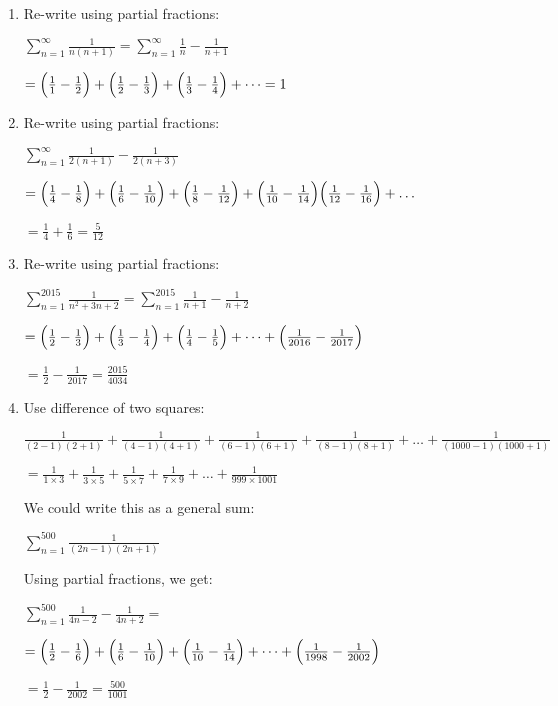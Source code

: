 \documentclass[../main.tex]{subfiles}
\begin{document}
\begin{enumerate}[itemsep=0.7cm]
    \item
    Re-write using partial fractions:

    $\sum\limits_{n=1}^\infty \frac{1}{n(n+1)}=\sum\limits_{n=1}^\infty \frac{1}{n}-\frac{1}{n+1}$

    $=\Bigl(\frac{1}{1}-\frac{1}{2}\Bigr)+\Bigl(\frac{1}{2}-\frac{1}{3}\Bigr)+\Bigl(\frac{1}{3}-\frac{1}{4}\Bigr)+\dots = 1$

    \item 
    Re-write using partial fractions:

    $\sum\limits_{n=1}^\infty \frac{1}{2(n+1)}-\frac{1}{2(n+3)}$

    $=\Bigl(\frac{1}{4}-\frac{1}{8}\Bigr)+\Bigl(\frac{1}{6}-\frac{1}{10}\Bigr)+\Bigl(\frac{1}{8}-\frac{1}{12}\Bigr)+\Bigl(\frac{1}{10}-\frac{1}{14}\Bigr)\Bigl(\frac{1}{12}-\frac{1}{16}\Bigr)+\dots$

    $=\frac{1}{4}+\frac{1}{6}=\frac{5}{12}$

    \item 
    Re-write using partial fractions:

    $\sum\limits_{n=1}^{2015} \frac{1}{n^2 +3n+2}=\sum\limits_{n=1}^{2015} \frac{1}{n+1}-\frac{1}{n+2}$

    $=\Bigl(\frac{1}{2}-\frac{1}{3}\Bigr)+\Bigl(\frac{1}{3}-\frac{1}{4}\Bigr)+\Bigl(\frac{1}{4}-\frac{1}{5}\Bigr)+\dots +\Bigl(\frac{1}{2016}-\frac{1}{2017}\Bigr)$

    $=\frac{1}{2}-\frac{1}{2017}=\frac{2015}{4034}$

    \item 
    Use difference of two squares:

    $\frac{1}{(2-1)(2+1)}+\frac{1}{(4-1)(4+1)}+\frac{1}{(6-1)(6+1)}+\frac{1}{(8-1)(8+1)}+\dots +\frac{1}{(1000-1)(1000+1)}$

    $=\frac{1}{1\times 3}+\frac{1}{3\times 5}+\frac{1}{5\times 7}+\frac{1}{7\times 9}+\dots +\frac{1}{999\times 1001}$

    We could write this as a general sum:

    $\sum\limits_{n=1}^{500} \frac{1}{(2n-1)(2n+1)}$

    Using partial fractions, we get:

    $\sum\limits_{n=1}^{500} \frac{1}{4n-2}-\frac{1}{4n+2}=$

    $=\Bigl(\frac{1}{2}-\frac{1}{6}\Bigr)+\Bigl(\frac{1}{6}-\frac{1}{10}\Bigr)+\Bigl(\frac{1}{10}-\frac{1}{14}\Bigr)+\dots +\Bigl(\frac{1}{1998}-\frac{1}{2002}\Bigr)$

    $=\frac{1}{2}-\frac{1}{2002}=\frac{500}{1001}$


\end{enumerate}
\end{document}
